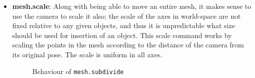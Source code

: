 \documentclass[a4paper,10pt]{article}
\begin{document}
\begin{itemize}
\item{\textbf{mesh.scale}: Along with being able to move an entire mesh, it makes sense to use the camera to scale it also; the scale of the axes in world-space are not fixed relative to any given objects, and thus it is unpredictable what size should be used for insertion of an object. This scale command works by scaling the points in the mesh according to the distance of the camera from its original pose. The scale is uniform in all axes.}

\begin{figure}
  \begin{center}
  \hspace{-10px}
  \caption{Behaviour of \texttt{mesh.subdivide}}
  \label{subdiv}
  \end{center}
\end{figure}


\end{itemize}
\end{document}
